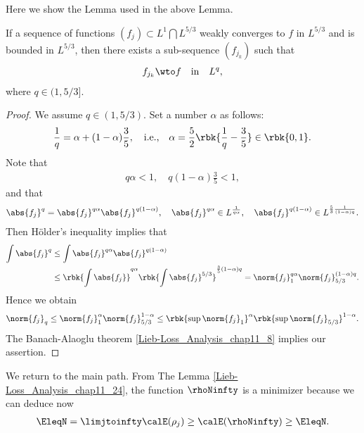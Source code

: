 \documentclass[openany, a4paper, oneside]{jsbook}
\begin{document}
Here we show the Lemma used in the above Lemma.
\begin{lem}\label{Lieb-Loss_Analysis_chap11_23}
 If a sequence of functions $(f_j) \subset L^{1} \bigcap L^{5/3}$ weakly converges to $f$ in $L^{5/3}$ and is bounded in $L^{5/3}$,
 then there exists a sub-sequence $(f_{j_k})$ such that
\begin{align}
 f_{j_k} \wto f \quad \mathrm{in} \quad L^q,
\end{align}
where $q \in (1, 5/3]$.
\end{lem}
\begin{proof}
We assume $q \in (1, 5/3)$.
Set a number $\alpha$ as follows:
\begin{align}
 \frac{1}{q}
 =
 \alpha + (1 - \alpha) \frac{3}{5}, \quad \text{i.e.,} \quad
 \alpha
 =
 \frac{5}{2} \rbk{\frac{1}{q} - \frac{3}{5}} \in \rbk{0, 1}.
\end{align}
Note that
\begin{align}
 q \alpha < 1, \quad q (1 - \alpha) \frac{3}{5} < 1,
\end{align}
and that
\begin{align}
 \abs{f_j}^{q}
 =
 \abs{f_j}^{q \alpha} \abs{f_j}^{q (1 - \alpha)}, \quad
 \abs{f_j}^{q \alpha} \in L^{\frac{1}{q \alpha}}, \quad
 \abs{f_j}^{q (1 - \alpha)} \in L^{\frac{5}{3} \frac{1}{(1 - \alpha) q}}.
\end{align}
Then H\"older's inequality implies that
\begin{align}
 \int \abs{f_j}^q
 &\leq
 \int \abs{f_j}^{q \alpha} \abs{f_j}^{q (1 - \alpha)} \\
 &\leq
 \rbk{\int \abs{f_j}}^{q \alpha} \rbk{\int \abs{f_j}^{5/3}}^{\frac{3}{5} (1 - \alpha) q}
 =
 \norm{f_j}_{1}^{q \alpha} \norm{f_j}_{5/3}^{(1 - \alpha) q}.
\end{align}
Hence we obtain
\begin{align}
 \norm{f_j}_{q}
 \leq
 \norm{f_j}_{1}^{\alpha} \norm{f_j}_{5/3}^{1 - \alpha}
 \leq
 \rbk{\sup \norm{f_j}_{1}}^{\alpha} \rbk{\sup \norm{f_j}_{5/3}}^{1 - \alpha}.
\end{align}
The Banach-Alaoglu theorem \ref{Lieb-Loss_Analysis_chap11_8} implies our assertion.
\end{proof}

We return to the main path.
From The Lemma \ref{Lieb-Loss_Analysis_chap11_24}, the function $\rhoNinfty$ is a minimizer because we can deduce now
\begin{align}
 \EleqN
 =
 \limjtoinfty \calE (\rho_j)
 \geq
 \calE (\rhoNinfty)
 \geq
 \EleqN.
\end{align}
\end{document}
